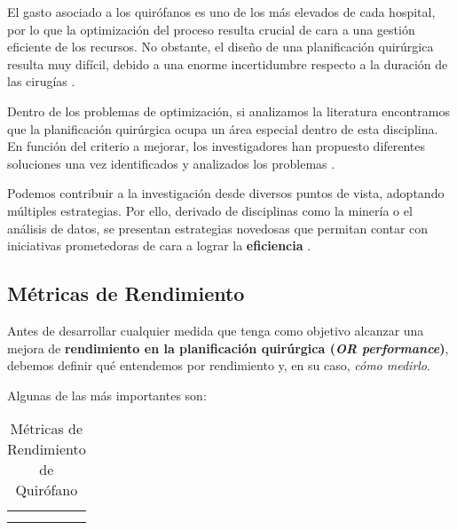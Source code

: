 El gasto asociado a los quirófanos es uno de los más elevados de cada hospital, por lo que la optimización del proceso resulta crucial de cara a una gestión eficiente de los recursos.
No obstante, el diseño de una planificación quirúrgica resulta muy difícil, debido a una enorme incertidumbre respecto a la duración de las cirugías \cite{Celik2023APrinciple}.

Dentro de los problemas de optimización, si analizamos la literatura encontramos que la planificación quirúrgica ocupa un área especial dentro de esta disciplina.
En función del criterio a mejorar, los investigadores han propuesto diferentes soluciones una vez identificados y analizados los problemas \cite{Gur2018ApplicationOverview}.

Podemos contribuir a la investigación desde diversos puntos de vista, adoptando múltiples estrategias.
Por ello, derivado de disciplinas como la minería o el análisis de datos, se presentan estrategias novedosas que permitan contar con iniciativas prometedoras de cara a lograr la \textbf{eficiencia }\cite{Schouten2023OperatingReview}.


\subsection{Métricas de Rendimiento}
Antes de desarrollar cualquier medida que tenga como objetivo alcanzar una mejora de \textbf{rendimiento en la planificación quirúrgica (\textit{OR performance})}, debemos definir qué entendemos por rendimiento y, en su caso, \textit{cómo medirlo}. 

Algunas de las más importantes son:
\begin{table}[]
    \centering
    \begin{tabular}{c|c}
         &  \\
         & 
    \end{tabular}
    \caption{Métricas de Rendimiento de Quirófano}
    \label{tab:my_label}
\end{table}



